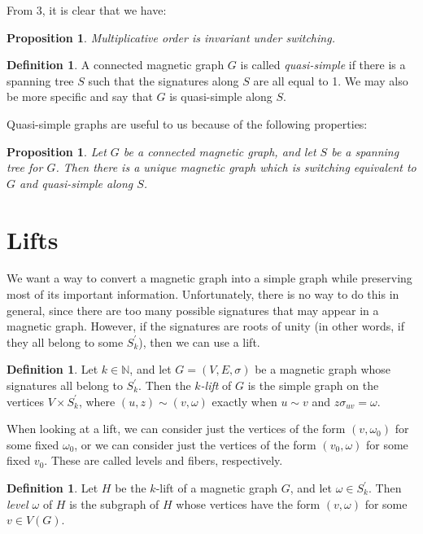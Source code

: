 \documentclass[12pt]{article}
\newtheorem{prop}[thm]{Proposition}
\theoremstyle{definition}
\newtheorem{defn}[thm]{Definition}
\newcommand{\N}{\mathbb N}
\begin{document}
From 3, it is clear that we have:

\begin{prop}
Multiplicative order is invariant under switching.
\end{prop}

\begin{defn}
A connected magnetic graph $G$ is called \textit{quasi-simple} if there is a spanning tree $S$ such that the signatures along $S$ are all equal to 1. We may also be more specific and say that $G$ is quasi-simple along $S$.
\end{defn}

Quasi-simple graphs are useful to us because of the following properties:



\begin{prop}
Let $G$ be a connected magnetic graph, and let $S$ be a spanning tree for $G$. Then there is a unique magnetic graph which is switching equivalent to $G$ and quasi-simple along $S$.
\end{prop}

\pagebreak
\section{Lifts}

We want a way to convert a magnetic graph into a simple graph while preserving most of its important information. Unfortunately, there is no way to do this in general, since there are too many possible signatures that may appear in a magnetic graph. However, if the signatures are roots of unity (in other words, if they all belong to some $S^\prime_k$), then we can use a lift.

\begin{defn}
Let $k \in \N$, and let $G = (V, E, \sigma)$ be a magnetic graph whose signatures all belong to $S^\prime_k$. Then the \textit{$k$-lift} of $G$ is the simple graph on the vertices $V \times S^\prime_k$, where $(u, z) \sim (v, \omega)$ exactly when $u \sim v$ and $z \sigma_{uv} = \omega$. 
\end{defn}

When looking at a lift, we can consider just the vertices of the form $(v, \omega_0)$ for some fixed $\omega_0$, or we can consider just the vertices of the form $(v_0, \omega)$ for some fixed $v_0$. These are called levels and fibers, respectively. 

\begin{defn}
Let $H$ be the $k$-lift of a magnetic graph $G$, and let $\omega \in S^\prime_k$. Then \textit{level $\omega$} of $H$ is the subgraph of $H$ whose vertices have the form $(v, \omega)$ for some $v \in V(G)$. 
\end{defn}
\end{document}
